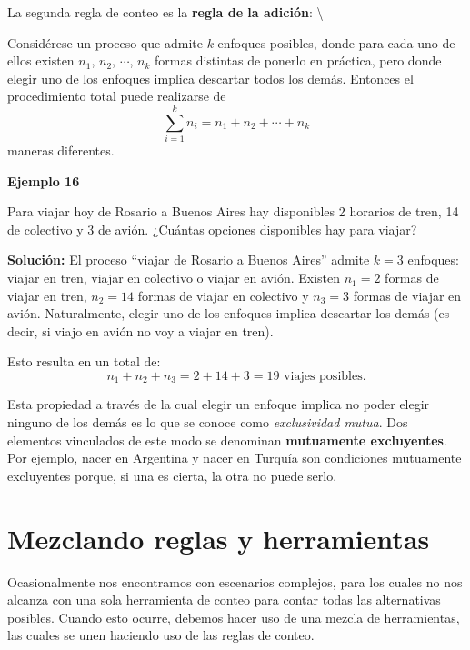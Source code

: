 \documentclass[
  letterpaper,
  DIV=11,
  numbers=noendperiod]{scrreprt}
\begin{document}
La segunda regla de conteo es la \textbf{regla de la adición}:
\textbackslash{}

Considérese un proceso que admite \(k\) enfoques posibles, donde para
cada uno de ellos existen \(n_1\), \(n_2\), \(\cdots\), \(n_k\) formas
distintas de ponerlo en práctica, pero donde elegir uno de los enfoques
implica descartar todos los demás. Entonces el procedimiento total puede
realizarse de \[\sum_{i=1}^k n_i = n_1 + n_2 + \cdots + n_k\] maneras
diferentes.

\begin{examplebox}

\begin{center}
\textbf{Ejemplo 16}

\end{center}

Para viajar hoy de Rosario a Buenos Aires hay disponibles 2 horarios de
tren, 14 de colectivo y 3 de avión. ¿Cuántas opciones disponibles hay
para viajar?

\textbf{Solución:} El proceso ``viajar de Rosario a Buenos Aires''
admite \(k=3\) enfoques: viajar en tren, viajar en colectivo o viajar en
avión. Existen \(n_1=2\) formas de viajar en tren, \(n_2=14\) formas de
viajar en colectivo y \(n_3=3\) formas de viajar en avión. Naturalmente,
elegir uno de los enfoques implica descartar los demás (es decir, si
viajo en avión no voy a viajar en tren).

Esto resulta en un total de:
\[n_1 + n_2 + n_3 = 2 + 14 + 3 = 19 \text{ viajes posibles.}\]

\end{examplebox}

Esta propiedad a través de la cual elegir un enfoque implica no poder
elegir ninguno de los demás es lo que se conoce como \emph{exclusividad
mutua}. Dos elementos vinculados de este modo se denominan
\textbf{mutuamente excluyentes}. Por ejemplo, nacer en Argentina y nacer
en Turquía son condiciones mutuamente excluyentes porque, si una es
cierta, la otra no puede serlo.

\hypertarget{mezclando-reglas-y-herramientas}{%
\section{Mezclando reglas y
herramientas}\label{mezclando-reglas-y-herramientas}}

Ocasionalmente nos encontramos con escenarios complejos, para los cuales
no nos alcanza con una sola herramienta de conteo para contar todas las
alternativas posibles. Cuando esto ocurre, debemos hacer uso de una
mezcla de herramientas, las cuales se unen haciendo uso de las reglas de
conteo.
\end{document}
